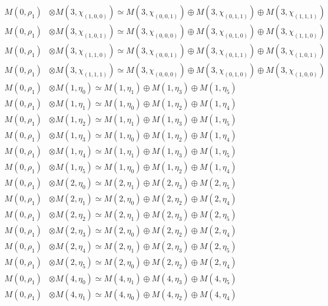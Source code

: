 \begin{align*}
M(0,\rho_{1}) &\otimes M(3,\chi_{(1,0,0)}) \simeq M(3,\chi_{(0,0,1)}) \oplus M(3,\chi_{(0,1,1)}) \oplus M(3,\chi_{(1,1,1)}) \\
M(0,\rho_{1}) &\otimes M(3,\chi_{(1,0,1)}) \simeq M(3,\chi_{(0,0,0)}) \oplus M(3,\chi_{(0,1,0)}) \oplus M(3,\chi_{(1,1,0)}) \\
M(0,\rho_{1}) &\otimes M(3,\chi_{(1,1,0)}) \simeq M(3,\chi_{(0,0,1)}) \oplus M(3,\chi_{(0,1,1)}) \oplus M(3,\chi_{(1,0,1)}) \\
M(0,\rho_{1}) &\otimes M(3,\chi_{(1,1,1)}) \simeq M(3,\chi_{(0,0,0)}) \oplus M(3,\chi_{(0,1,0)}) \oplus M(3,\chi_{(1,0,0)}) \\
M(0,\rho_{1}) &\otimes M(1,\eta_{0}) \simeq M(1,\eta_{1}) \oplus M(1,\eta_{3}) \oplus M(1,\eta_{5}) \\
M(0,\rho_{1}) &\otimes M(1,\eta_{1}) \simeq M(1,\eta_{0}) \oplus M(1,\eta_{2}) \oplus M(1,\eta_{4}) \\
M(0,\rho_{1}) &\otimes M(1,\eta_{2}) \simeq M(1,\eta_{1}) \oplus M(1,\eta_{3}) \oplus M(1,\eta_{5}) \\
M(0,\rho_{1}) &\otimes M(1,\eta_{3}) \simeq M(1,\eta_{0}) \oplus M(1,\eta_{2}) \oplus M(1,\eta_{4}) \\
M(0,\rho_{1}) &\otimes M(1,\eta_{4}) \simeq M(1,\eta_{1}) \oplus M(1,\eta_{3}) \oplus M(1,\eta_{5}) \\
M(0,\rho_{1}) &\otimes M(1,\eta_{5}) \simeq M(1,\eta_{0}) \oplus M(1,\eta_{2}) \oplus M(1,\eta_{4}) \\
M(0,\rho_{1}) &\otimes M(2,\eta_{0}) \simeq M(2,\eta_{1}) \oplus M(2,\eta_{3}) \oplus M(2,\eta_{5}) \\
M(0,\rho_{1}) &\otimes M(2,\eta_{1}) \simeq M(2,\eta_{0}) \oplus M(2,\eta_{2}) \oplus M(2,\eta_{4}) \\
M(0,\rho_{1}) &\otimes M(2,\eta_{2}) \simeq M(2,\eta_{1}) \oplus M(2,\eta_{3}) \oplus M(2,\eta_{5}) \\
M(0,\rho_{1}) &\otimes M(2,\eta_{3}) \simeq M(2,\eta_{0}) \oplus M(2,\eta_{2}) \oplus M(2,\eta_{4}) \\
M(0,\rho_{1}) &\otimes M(2,\eta_{4}) \simeq M(2,\eta_{1}) \oplus M(2,\eta_{3}) \oplus M(2,\eta_{5}) \\
M(0,\rho_{1}) &\otimes M(2,\eta_{5}) \simeq M(2,\eta_{0}) \oplus M(2,\eta_{2}) \oplus M(2,\eta_{4}) \\
M(0,\rho_{1}) &\otimes M(4,\eta_{0}) \simeq M(4,\eta_{1}) \oplus M(4,\eta_{3}) \oplus M(4,\eta_{5}) \\
M(0,\rho_{1}) &\otimes M(4,\eta_{1}) \simeq M(4,\eta_{0}) \oplus M(4,\eta_{2}) \oplus M(4,\eta_{4}) \\

\end{align*}
